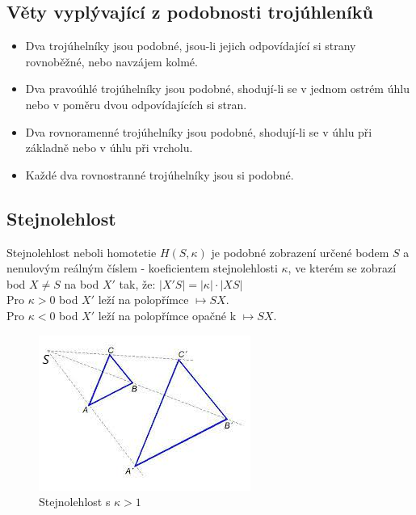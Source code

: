     \subsection{Věty vyplývající z podobnosti trojúhleníků}
        \begin{itemize}
            \item Dva trojúhelníky jsou podobné, jsou-li jejich odpovídající si strany rovnoběžné, nebo navzájem kolmé.
            \item Dva pravoúhlé trojúhelníky jsou podobné, shodují-li se v jednom ostrém úhlu nebo v poměru dvou odpovídajících si stran.
            \item Dva rovnoramenné trojúhelníky jsou podobné, shodují-li se v úhlu při základně nebo v úhlu při vrcholu.
            \item Každé dva rovnostranné trojúhelníky jsou si podobné.
        \end{itemize}
    
    \subsection{Stejnolehlost}
        Stejnolehlost neboli homotetie $H(S,\kappa)$ je podobné zobrazení určené bodem $S$ a nenulovým reálným číslem - koeficientem stejnolehlosti $\kappa$, ve kterém se zobrazí bod $X \neq S$ na bod $X'$ tak, že: $\left| X'S \right| = \left| \kappa \right| \cdot \left| XS \right|$\\
        Pro $\kappa > 0$ bod $X'$ leží na polopřímce $\mapsto SX$.\\
        Pro $\kappa < 0$ bod $X'$ leží na polopřímce opačné k $\mapsto SX$.\\

        \begin{figure}[H]
            \centering
            \includegraphics[width=0.5\linewidth]{img/23_stejnolehlost.png}
            \caption{Stejnolehlost s $\kappa>1$} 
            \label{fig:enter-label}
        \end{figure}
        
